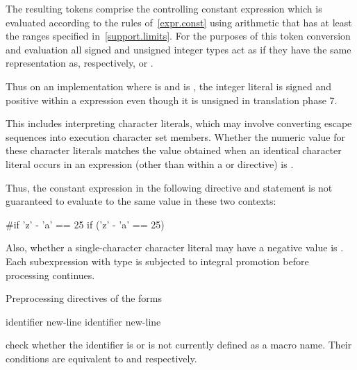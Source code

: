 \pnum
The resulting tokens comprise the controlling constant expression
which is evaluated according to the rules of~\ref{expr.const}
using arithmetic that has at least the ranges specified
in~\ref{support.limits}. For the purposes of this token conversion and evaluation
all signed and unsigned integer types
act as if they have the same representation as, respectively,
 or .
\begin{note}
Thus on an
implementation where  is 
and  is ,
the integer literal  is signed and positive within a 
expression even though it is unsigned in translation phase
7.
\end{note}
This includes interpreting character literals, which may involve
converting escape sequences into execution character set members.
Whether the numeric value for these character literals
matches the value obtained when an identical character literal
occurs in an expression
(other than within a
or
directive)
is .
\begin{note}
Thus, the constant expression in the following
directive and
 statement
is not guaranteed to evaluate to the same value in these two
contexts:
\begin{codeblock}
#if 'z' - 'a' == 25
if ('z' - 'a' == 25)
\end{codeblock}
\end{note}
Also, whether a single-character character literal may have a negative
value is .
Each subexpression with type
is subjected to integral promotion before processing continues.

\pnum
Preprocessing directives of the forms
\begin{ncsimplebnf}\obeyspaces
{} identifier new-line \br
{}%
 identifier new-line 
%
\end{ncsimplebnf}
check whether the identifier is or is not currently defined as a macro name.
Their conditions are equivalent to
and
respectively.

